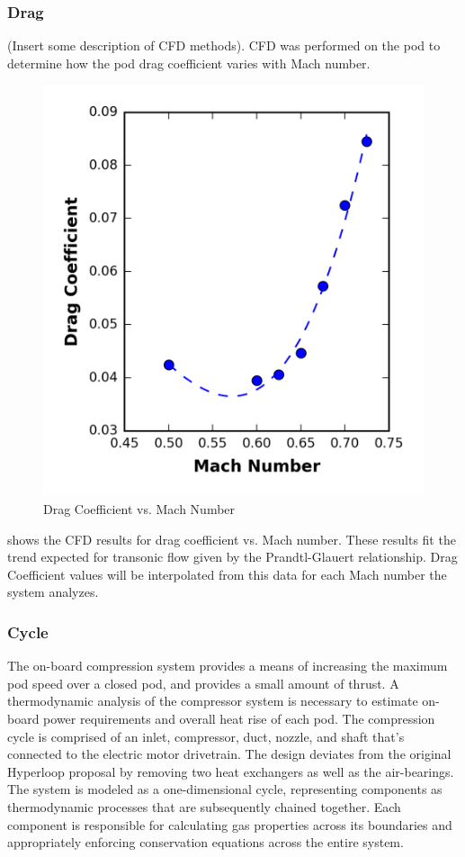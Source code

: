 \subsubsection{Drag}
	(Insert some description of CFD methods).
	CFD was performed on the pod to determine how the pod drag coefficient varies with Mach number.
	\begin{figure}
		\centering
		\includegraphics{../../images/graphs/cd_vs_mach/cd_vs_mach.png}
		\caption{Drag Coefficient vs. Mach Number}
		\label{fig:cd_vs_mach}
	\end{figure}
	 shows the CFD results for drag coefficient vs. Mach number.
	These results fit the trend expected for transonic flow given by the
	Prandtl-Glauert relationship. Drag Coefficient values will be interpolated
	from this data for each Mach number the system analyzes.
\subsubsection{Cycle}
	The on-board compression system provides a means of increasing the maximum
	pod speed over a closed pod,  and provides a small amount of thrust.
	A thermodynamic analysis of the compressor system is necessary to estimate
	on- board power requirements and overall heat rise of each pod.
	The compression cycle is comprised of an inlet, compressor, duct, nozzle,
	and shaft that's connected to the electric motor drivetrain. The design
	deviates from the original Hyperloop proposal by removing two heat
	exchangers as well as the air-bearings. The system is modeled as a
	one-dimensional cycle, representing components as thermodynamic processes
	that are subsequently chained together. Each component is responsible for
	calculating gas properties across its boundaries and appropriately enforcing
	conservation equations across the entire system.
